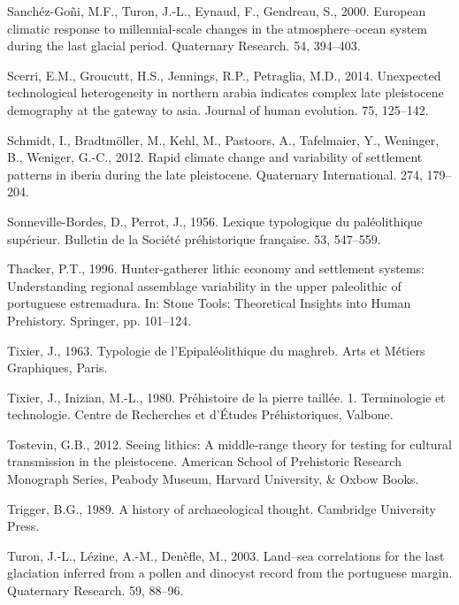 \documentclass[12pt,twoside]{reedthesis}
\begin{document}
\leavevmode\hypertarget{ref-goni2000}{}%
Sanchéz-Goñi, M.F., Turon, J.-L., Eynaud, F., Gendreau, S., 2000. European climatic response to millennial-scale changes in the atmosphere--ocean system during the last glacial period. Quaternary Research. 54, 394--403.

\leavevmode\hypertarget{ref-scerri2014}{}%
Scerri, E.M., Groucutt, H.S., Jennings, R.P., Petraglia, M.D., 2014. Unexpected technological heterogeneity in northern arabia indicates complex late pleistocene demography at the gateway to asia. Journal of human evolution. 75, 125--142.

\leavevmode\hypertarget{ref-schmidt2012}{}%
Schmidt, I., Bradtmöller, M., Kehl, M., Pastoors, A., Tafelmaier, Y., Weninger, B., Weniger, G.-C., 2012. Rapid climate change and variability of settlement patterns in iberia during the late pleistocene. Quaternary International. 274, 179--204.

\leavevmode\hypertarget{ref-sonneville-bordes1956}{}%
Sonneville-Bordes, D., Perrot, J., 1956. Lexique typologique du paléolithique supérieur. Bulletin de la Société préhistorique française. 53, 547--559.

\leavevmode\hypertarget{ref-thacker1996}{}%
Thacker, P.T., 1996. Hunter-gatherer lithic economy and settlement systems: Understanding regional assemblage variability in the upper paleolithic of portuguese estremadura. In: Stone Tools: Theoretical Insights into Human Prehistory. Springer, pp. 101--124.

\leavevmode\hypertarget{ref-tixier1963}{}%
Tixier, J., 1963. Typologie de l'Epipaléolithique du maghreb. Arts et Métiers Graphiques, Paris.

\leavevmode\hypertarget{ref-tixier1980}{}%
Tixier, J., Inizian, M.-L., 1980. Préhistoire de la pierre taillée. 1. Terminologie et technologie. Centre de Recherches et d'Études Préhistoriques, Valbone.

\leavevmode\hypertarget{ref-tostevin2012}{}%
Tostevin, G.B., 2012. Seeing lithics: A middle-range theory for testing for cultural transmission in the pleistocene. American School of Prehistoric Research Monograph Series, Peabody Museum, Harvard University, \& Oxbow Books.

\leavevmode\hypertarget{ref-trigger1989}{}%
Trigger, B.G., 1989. A history of archaeological thought. Cambridge University Press.

\leavevmode\hypertarget{ref-turon2003}{}%
Turon, J.-L., Lézine, A.-M., Denèfle, M., 2003. Land--sea correlations for the last glaciation inferred from a pollen and dinocyst record from the portuguese margin. Quaternary Research. 59, 88--96.
\end{document}
